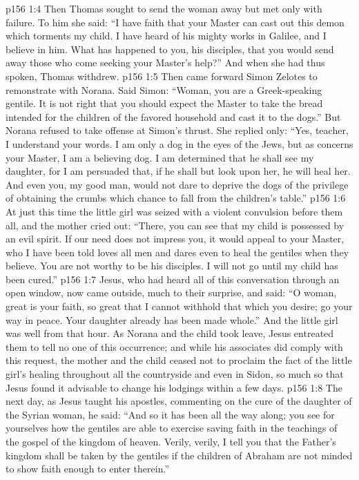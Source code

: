 \vs p156 1:4 Then Thomas sought to send the woman away but met only with failure. To him she said: “I have faith that your Master can cast out this demon which torments my child. I have heard of his mighty works in Galilee, and I believe in him. What has happened to you, his disciples, that you would send away those who come seeking your Master’s help?” And when she had thus spoken, Thomas withdrew.
\vs p156 1:5 Then came forward Simon Zelotes to remonstrate with Norana. Said Simon: “Woman, you are a Greek\hyp{}speaking gentile. It is not right that you should expect the Master to take the bread intended for the children of the favored household and cast it to the dogs.” But Norana refused to take offense at Simon’s thrust. She replied only: “Yes, teacher, I understand your words. I am only a dog in the eyes of the Jews, but as concerns your Master, I am a believing dog. I am determined that he shall see my daughter, for I am persuaded that, if he shall but look upon her, he will heal her. And even you, my good man, would not dare to deprive the dogs of the privilege of obtaining the crumbs which chance to fall from the children’s table.”
\vs p156 1:6 At just this time the little girl was seized with a violent convulsion before them all, and the mother cried out: “There, you can see that my child is possessed by an evil spirit. If our need does not impress you, it would appeal to your Master, who I have been told loves all men and dares even to heal the gentiles when they believe. You are not worthy to be his disciples. I will not go until my child has been cured.”
\vs p156 1:7 Jesus, who had heard all of this conversation through an open window, now came outside, much to their surprise, and said: \textcolor{ubdarkred}{“O woman, great is your faith, so great that I cannot withhold that which you desire; go your way in peace. Your daughter already has been made whole.”} And the little girl was well from that hour. As Norana and the child took leave, Jesus entreated them to tell no one of this occurrence; and while his associates did comply with this request, the mother and the child ceased not to proclaim the fact of the little girl’s healing throughout all the countryside and even in Sidon, so much so that Jesus found it advisable to change his lodgings within a few days.
\pc \vs p156 1:8 The next day, as Jesus taught his apostles, commenting on the cure of the daughter of the Syrian woman, he said: \textcolor{ubdarkred}{“And so it has been all the way along; you see for yourselves how the gentiles are able to exercise saving faith in the teachings of the gospel of the kingdom of heaven. Verily, verily, I tell you that the Father’s kingdom shall be taken by the gentiles if the children of Abraham are not minded to show faith enough to enter therein.”}
